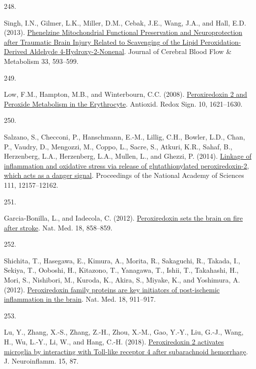 \documentclass[
]{article}
\newlength{\cslhangindent}
\newlength{\csllabelwidth}
\newlength{\cslentryspacingunit} %
\newenvironment{CSLReferences}[2] %
 {%
  \setlength{\parindent}{0pt}
  \ifodd #1
  \let\oldpar\par
  \def\par{\hangindent=\cslhangindent\oldpar}
  \fi
  \setlength{\parskip}{#2\cslentryspacingunit}
 }%
 {}
\newcommand{\CSLLeftMargin}[1]{\parbox[t]{\csllabelwidth}{#1}}
\newcommand{\CSLRightInline}[1]{\parbox[t]{\linewidth - \csllabelwidth}{#1}\break}
\begin{document}
\begin{CSLReferences}{0}{0}
\leavevmode{}%
\CSLLeftMargin{248. }
\CSLRightInline{Singh, I.N., Gilmer, L.K., Miller, D.M., Cebak, J.E., Wang, J.A., and Hall, E.D. (2013). \href{https://doi.org/10.1038/jcbfm.2012.211}{Phenelzine {Mitochondrial Functional Preservation} and {Neuroprotection} after {Traumatic Brain Injury Related} to {Scavenging} of the {Lipid Peroxidation-Derived Aldehyde} 4-{Hydroxy-2-Nonenal}}. Journal of Cerebral Blood Flow \& Metabolism 33, 593--599.}

\leavevmode{}%
\CSLLeftMargin{249. }
\CSLRightInline{Low, F.M., Hampton, M.B., and Winterbourn, C.C. (2008). \href{https://doi.org/10.1089/ars.2008.2081}{Peroxiredoxin 2 and {Peroxide Metabolism} in the {Erythrocyte}}. Antioxid. Redox Sign. 10, 1621--1630.}

\leavevmode{}%
\CSLLeftMargin{250. }
\CSLRightInline{Salzano, S., Checconi, P., Hanschmann, E.-M., Lillig, C.H., Bowler, L.D., Chan, P., Vaudry, D., Mengozzi, M., Coppo, L., Sacre, S., Atkuri, K.R., Sahaf, B., Herzenberg, L.A., Herzenberg, L.A., Mullen, L., and Ghezzi, P. (2014). \href{https://doi.org/10.1073/pnas.1401712111}{Linkage of inflammation and oxidative stress via release of glutathionylated peroxiredoxin-2, which acts as a danger signal}. Proceedings of the National Academy of Sciences 111, 12157--12162.}

\leavevmode{}%
\CSLLeftMargin{251. }
\CSLRightInline{Garcia-Bonilla, L., and Iadecola, C. (2012). \href{https://doi.org/10.1038/nm.2797}{Peroxiredoxin sets the brain on fire after stroke}. Nat. Med. 18, 858--859.}

\leavevmode{}%
\CSLLeftMargin{252. }
\CSLRightInline{Shichita, T., Hasegawa, E., Kimura, A., Morita, R., Sakaguchi, R., Takada, I., Sekiya, T., Ooboshi, H., Kitazono, T., Yanagawa, T., Ishii, T., Takahashi, H., Mori, S., Nishibori, M., Kuroda, K., Akira, S., Miyake, K., and Yoshimura, A. (2012). \href{https://doi.org/10.1038/nm.2749}{Peroxiredoxin family proteins are key initiators of post-ischemic inflammation in the brain}. Nat. Med. 18, 911--917.}

\leavevmode{}%
\CSLLeftMargin{253. }
\CSLRightInline{Lu, Y., Zhang, X.-S., Zhang, Z.-H., Zhou, X.-M., Gao, Y.-Y., Liu, G.-J., Wang, H., Wu, L.-Y., Li, W., and Hang, C.-H. (2018). \href{https://doi.org/10.1186/s12974-018-1118-4}{Peroxiredoxin 2 activates microglia by interacting with {Toll-like} receptor 4 after subarachnoid hemorrhage}. J. Neuroinflamm. 15, 87.}


\end{CSLReferences}
\end{document}
